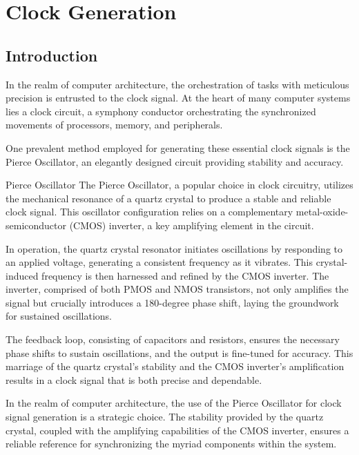 \chapter{Clock Generation}

\section{Introduction}

In the realm of computer architecture, the orchestration of tasks with meticulous precision is entrusted to the clock signal. At the heart of many computer systems lies a clock circuit, a symphony conductor orchestrating the synchronized movements of processors, memory, and peripherals. 

One prevalent method employed for generating these essential clock signals is the Pierce Oscillator, an elegantly designed circuit providing stability and accuracy.

\begin{theory}{Pierce Oscillator}
  The Pierce Oscillator, a popular choice in clock circuitry, utilizes the mechanical resonance of a quartz crystal to produce a stable and reliable clock signal. This oscillator configuration relies on a complementary metal-oxide-semiconductor (CMOS) inverter, a key amplifying element in the circuit.

  In operation, the quartz crystal resonator initiates oscillations by responding to an applied voltage, generating a consistent frequency as it vibrates. This crystal-induced frequency is then harnessed and refined by the CMOS inverter. The inverter, comprised of both PMOS and NMOS transistors, not only amplifies the signal but crucially introduces a 180-degree phase shift, laying the groundwork for sustained oscillations.

  The feedback loop, consisting of capacitors and resistors, ensures the necessary phase shifts to sustain oscillations, and the output is fine-tuned for accuracy. This marriage of the quartz crystal's stability and the CMOS inverter's amplification results in a clock signal that is both precise and dependable.
\end{theory}

In the realm of computer architecture, the use of the Pierce Oscillator for clock signal generation is a strategic choice. The stability provided by the quartz crystal, coupled with the amplifying capabilities of the CMOS inverter, ensures a reliable reference for synchronizing the myriad components within the system.

